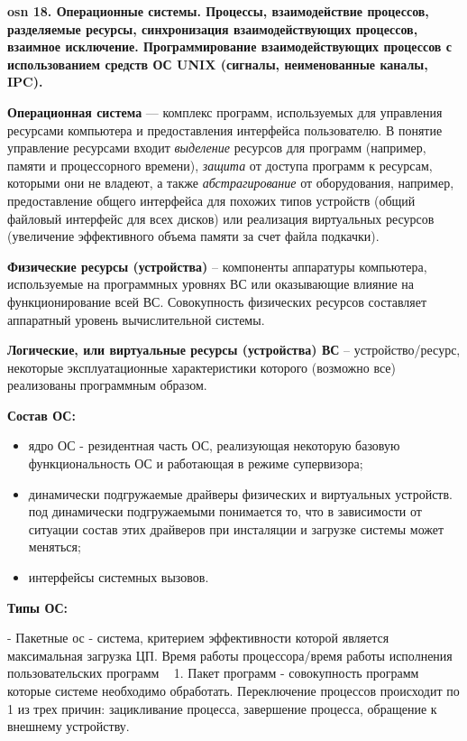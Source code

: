 \setcounter{section}{15}
\setcounter{subsection}{18}
\setcounter{equation}{0}
\textbf{\LARGE osn 18. Операционные системы. Процессы, взаимодействие процессов, разделяемые ресурсы, синхронизация взаимодействующих процессов, взаимное исключение. Программирование взаимодействующих процессов с использованием средств ОС UNIX (сигналы, неименованные каналы, IPC).}

\textbf{Операционная система} --- комплекс программ, используемых для управления ресурсами компьютера и предоставления интерфейса пользователю.
В понятие управление ресурсами входит \textit{выделение} ресурсов для программ (например, памяти и процессорного времени),
\textit{защита} от доступа программ к ресурсам, которыми они не владеют, а также
\textit{абстрагирование} от оборудования, например, предоставление общего интерфейса для похожих типов устройств
(общий файловый интерфейс для всех дисков) или реализация виртуальных ресурсов (увеличение эффективного объема памяти за счет файла подкачки).

\textbf{Физические ресурсы (устройства)} -- компоненты аппаратуры компьютера, используемые на программных уровнях ВС или оказывающие влияние на функционирование всей ВС. Совокупность физических ресурсов составляет аппаратный уровень вычислительной системы.

\textbf{Логические, или виртуальные ресурсы (устройства) ВС} -- устройство/ресурс, некоторые эксплуатационные характеристики которого (возможно все) реализованы программным образом.

\textbf{Состав ОС:} 
\begin{itemize}
    \item ядро ОС - резидентная часть ОС, реализующая некоторую базовую функциональность ОС и работающая в режиме супервизора;
    \item динамически подгружаемые драйверы физических и виртуальных устройств. под динамически подгружаемыми понимается то, что в зависимости от ситуации состав этих драйверов при инсталяции и загрузке системы может меняться;
    \item интерфейсы системных вызовов.
\end{itemize} 

\textbf{Типы ОС:} 

- Пакетные ос  - система, критерием эффективности которой является максимальная загрузка ЦП. Время работы процессора/время работы исполнения пользовательских программ ~ 1. Пакет программ - совокупность программ которые системе необходимо обработать. Переключение процессов происходит по 1 из трех причин: зацикливание процесса, завершение процесса, обращение к внешнему устройству. 

